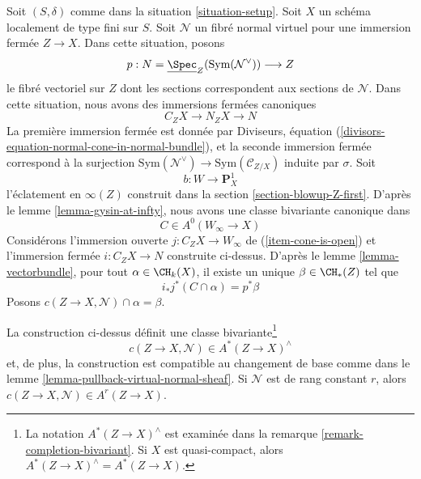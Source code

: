 \noindent
Soit $(S, \delta)$ comme dans la situation \ref{situation-setup}. Soit $X$ un schéma
localement de type fini sur $S$. Soit $\mathcal{N}$ un fibré normal virtuel
pour une immersion fermée $Z \to X$. Dans cette situation, posons
$$
p : N = \underline{\Spec}_Z(\text{Sym}(\mathcal{N}^\vee)) \longrightarrow Z
$$
le fibré vectoriel sur $Z$
dont les sections correspondent aux sections de $\mathcal{N}$.
Dans cette situation, nous avons des immersions fermées canoniques
$$
C_ZX \longrightarrow N_ZX \longrightarrow N
$$
La première immersion fermée est donnée par Diviseurs, équation
(\ref{divisors-equation-normal-cone-in-normal-bundle}),
et la seconde immersion fermée correspond à la surjection
$\text{Sym}(\mathcal{N}^\vee) \to \text{Sym}(\mathcal{C}_{Z/X})$
induite par $\sigma$.
Soit
$$
b : W \longrightarrow \mathbf{P}^1_X
$$
l'éclatement en $\infty(Z)$ construit dans la
section \ref{section-blowup-Z-first}. D'après le
lemme \ref{lemma-gysin-at-infty},
nous avons une classe bivariante canonique dans
$$
C \in A^0(W_\infty \to X)
$$
Considérons l'immersion ouverte $j : C_ZX \to W_\infty$ de
(\ref{item-cone-is-open}) et l'immersion fermée
$i : C_ZX \to N$ construite ci-dessus. D'après le lemme \ref{lemma-vectorbundle},
pour tout $\alpha \in \CH_k(X)$, il existe un unique
$\beta \in \CH_*(Z)$ tel que
$$
i_*j^*(C \cap \alpha) = p^*\beta
$$
Posons $c(Z \to X, \mathcal{N}) \cap \alpha = \beta$.

\begin{lemma}
\label{lemma-construction-gysin}
La construction ci-dessus définit une classe bivariante\footnote{La
notation $A^*(Z \to X)^\wedge$ est examinée dans la
remarque \ref{remark-completion-bivariant}.
Si $X$ est quasi-compact, alors $A^*(Z \to X)^\wedge = A^*(Z \to X)$.}
$$
c(Z \to X, \mathcal{N}) \in A^*(Z \to X)^\wedge
$$
et, de plus, la construction est compatible au changement de base
comme dans le lemme \ref{lemma-pullback-virtual-normal-sheaf}.
Si $\mathcal{N}$ est de rang constant $r$, alors
$c(Z \to X, \mathcal{N}) \in A^r(Z \to X)$.
\end{lemma}


